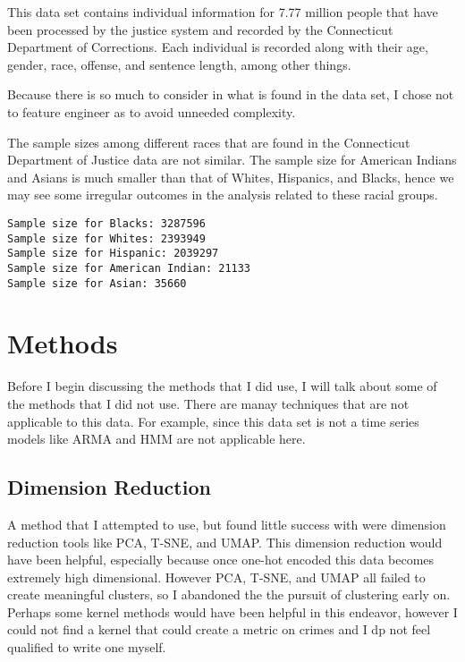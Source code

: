 \documentclass[11pt]{article}
\begin{document}
This data set contains individual information for 7.77 million people
that have been processed by the justice system and recorded by the
Connecticut Department of Corrections. Each individual is recorded along
with their age, gender, race, offense, and sentence length, among other
things.

Because there is so much to consider in what is found in the data set, I
chose not to feature engineer as to avoid unneeded complexity.

The sample sizes among different races that are found in the Connecticut
Department of Justice data are not similar. The sample size for American
Indians and Asians is much smaller than that of Whites, Hispanics, and
Blacks, hence we may see some irregular outcomes in the analysis related
to these racial groups.

    \begin{Verbatim}[commandchars=\\\{\}]
Sample size for Blacks: 3287596
Sample size for Whites: 2393949
Sample size for Hispanic: 2039297
Sample size for American Indian: 21133
Sample size for Asian: 35660

    \end{Verbatim}

    \hypertarget{methods}{%
\section{Methods}\label{methods}}

Before I begin discussing the methods that I did use, I will talk about
some of the methods that I did not use. There are manay techniques that
are not applicable to this data. For example, since this data set is not
a time series models like ARMA and HMM are not applicable here.

\hypertarget{dimension-reduction}{%
\subsection{Dimension Reduction}\label{dimension-reduction}}

A method that I attempted to use, but found little success with were
dimension reduction tools like PCA, T-SNE, and UMAP. This dimension
reduction would have been helpful, especially because once one-hot
encoded this data becomes extremely high dimensional. However PCA,
T-SNE, and UMAP all failed to create meaningful clusters, so I abandoned
the the pursuit of clustering early on. Perhaps some kernel methods
would have been helpful in this endeavor, however I could not find a
kernel that could create a metric on crimes and I dp not feel qualified
to write one myself.
\end{document}
